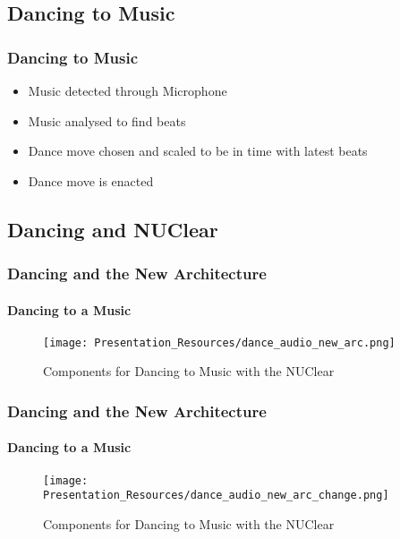 \documentclass{beamer}
\begin{document}
	\subsection{Dancing to Music} %
	\begin{frame}
		\frametitle{Dancing to Music}
		\begin{itemize}
			\item Music detected through Microphone
			\item Music analysed to find beats
			\item Dance move chosen and scaled to be in time with latest beats
			\item Dance move is enacted
		\end{itemize}
	\end{frame}
	\subsection{Dancing and NUClear} %
	\begin{frame}
		\frametitle{Dancing and the New Architecture}
		\framesubtitle{Dancing to a Music}
		\begin{figure}
			\centering
			\texttt{[image: Presentation\_Resources/dance\_audio\_new\_arc.png]}
			\caption{Components for Dancing to Music with the NUClear}
		\end{figure}
	\end{frame}
	\begin{frame}
		\frametitle{Dancing and the New Architecture}
		\framesubtitle{Dancing to a Music}
		\begin{figure}
			\centering
			\texttt{[image: Presentation\_Resources/dance\_audio\_new\_arc\_change.png]}
			\caption{Components for Dancing to Music with the NUClear}
		\end{figure}
	\end{frame}
\end{document}
